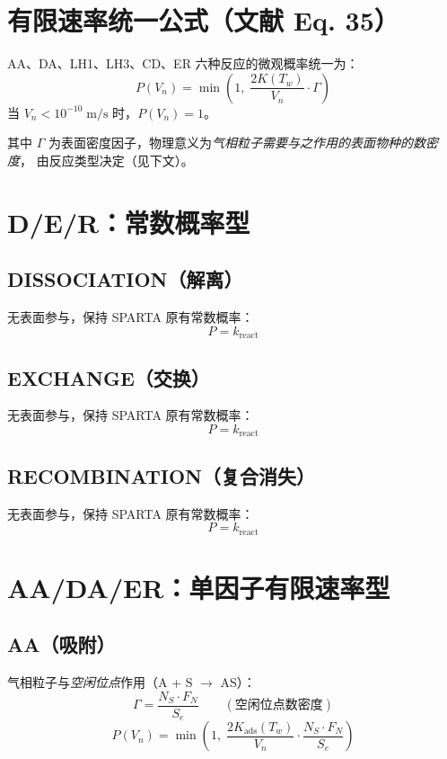 \documentclass[12pt,a4paper]{article}
\begin{document}
\section{有限速率统一公式（文献 Eq. 35）}
AA、DA、LH1、LH3、CD、ER 六种反应的微观概率统一为：
\begin{equation}
  \boxed{P(V_n) = \min\!\left(1,\; \frac{2K(T_w)}{V_n} \cdot \Gamma\right)}
\end{equation}
当 $V_n < 10^{-10} \; \text{m/s}$ 时，$P(V_n) = 1$。

其中 $\Gamma$ 为表面密度因子，物理意义为\emph{气相粒子需要与之作用的表面物种的数密度}，
由反应类型决定（见下文）。

\section{D/E/R：常数概率型}

\subsection{DISSOCIATION（解离）}
无表面参与，保持 SPARTA 原有常数概率：
\begin{equation}
  P = k_{\text{react}}
\end{equation}

\subsection{EXCHANGE（交换）}
无表面参与，保持 SPARTA 原有常数概率：
\begin{equation}
  P = k_{\text{react}}
\end{equation}

\subsection{RECOMBINATION（复合消失）}
无表面参与，保持 SPARTA 原有常数概率：
\begin{equation}
  P = k_{\text{react}}
\end{equation}

\section{AA/DA/ER：单因子有限速率型}

\subsection{AA（吸附）}
气相粒子与\emph{空闲位点}作用（A + S $\to$ AS）：
\begin{equation}
  \Gamma = \frac{N_S \cdot F_N}{S_e} \qquad (\text{空闲位点数密度})
\end{equation}
\begin{equation}
  P(V_n) = \min\!\left(1,\; \frac{2 K_{\text{ads}}(T_w)}{V_n} \cdot \frac{N_S \cdot F_N}{S_e}\right)
\end{equation}
\end{document}
